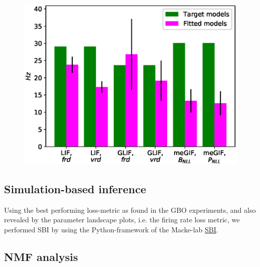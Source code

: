 \documentclass[mphil,deptreport,ianc]{infthesis} %
\begin{document}
\begin{figure}
	\includegraphics{figures/export_rates_only_GT_all.eps}
\end{figure}


\subsection{Simulation-based inference}

Using the best performing loss-metric as found in the GBO experiments, and also revealed by the parameter landscape plots, i.e. the firing rate loss metric, we performed SBI by using the Python-framework of the Macke-lab \href{https://github.com/mackelab/sbi}{SBI}.



\subsection{NMF analysis}

\end{document}
